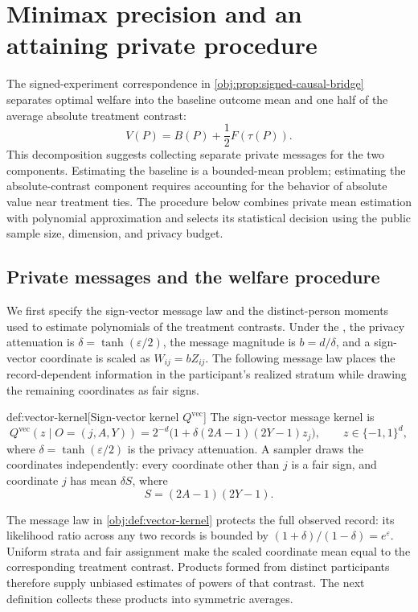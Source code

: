 \section{Minimax precision and an attaining private procedure}

The signed-experiment correspondence in \cref{obj:prop:signed-causal-bridge} separates optimal welfare into the baseline outcome mean and one half of the average absolute treatment contrast:
\[
V(P)=B(P)+\frac12F(\tau(P)).
\]
This decomposition suggests collecting separate private messages for the two components. Estimating the baseline is a bounded-mean problem; estimating the absolute-contrast component requires accounting for the behavior of absolute value near treatment ties. The procedure below combines private mean estimation with polynomial approximation and selects its statistical decision using the public sample size, dimension, and privacy budget.

\subsection{Private messages and the welfare procedure}

We first specify the sign-vector message law and the distinct-person moments used to estimate polynomials of the treatment contrasts. Under the , the privacy attenuation is \(\delta=\tanh(\varepsilon/2)\), the message magnitude is \(b=d/\delta\), and a sign-vector coordinate is scaled as \(W_{ij}=bZ_{ij}\). The following message law places the record-dependent information in the participant's realized stratum while drawing the remaining coordinates as fair signs.

\begin{definitionv}{def:vector-kernel}[Sign-vector kernel $Q^{\mathrm{vec}}$]
The sign-vector message kernel is
\[
Q^{\mathrm{vec}}(z\mid O=(j,A,Y))
=
2^{-d}\bigl(1+\delta(2A-1)(2Y-1)z_j\bigr),
\qquad z\in\{-1,1\}^d,
\]
where \(\delta=\tanh(\varepsilon/2)\) is the privacy attenuation. A sampler draws the coordinates independently: every coordinate other than \(j\) is a fair sign, and coordinate \(j\) has mean \(\delta S\), where
\[
S=(2A-1)(2Y-1).
\]
\end{definitionv}

The message law  in \cref{obj:def:vector-kernel} protects the full observed record: its likelihood ratio across any two records is bounded by \((1+\delta)/(1-\delta)=e^\varepsilon\). Uniform strata and fair assignment make the scaled coordinate mean equal to the corresponding treatment contrast. Products formed from distinct participants therefore supply unbiased estimates of powers of that contrast. The next definition collects these products into symmetric averages.

